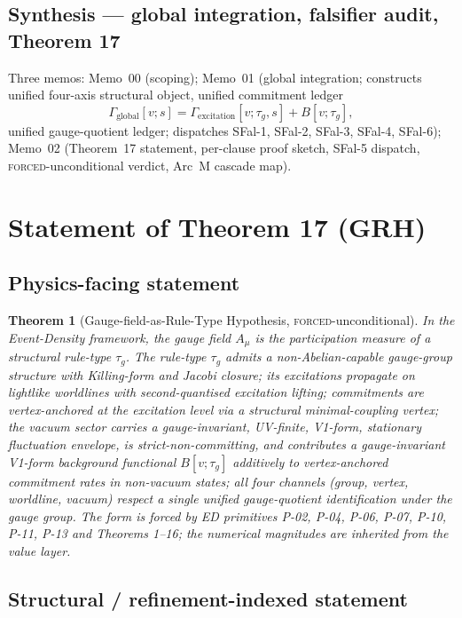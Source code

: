\documentclass[11pt,a4paper]{article}
\newtheorem{theorem}{Theorem}
\begin{document}
\subsection{Synthesis --- global integration, falsifier audit, Theorem 17}

Three memos: Memo~00 (scoping); Memo~01 (global integration; constructs unified four-axis structural object, unified commitment ledger
\[
\Gamma_{\text{global}}[v;s] = \Gamma_{\text{excitation}}[v;\tau_g,s] + B[v;\tau_g],
\]
unified gauge-quotient ledger; dispatches SFal-1, SFal-2, SFal-3, SFal-4, SFal-6); Memo~02 (Theorem~17 statement, per-clause proof sketch, SFal-5 dispatch, \textsc{forced}-unconditional verdict, Arc~M cascade map).

\section{Statement of Theorem 17 (GRH)}

\subsection{Physics-facing statement}

\begin{theorem}[Gauge-field-as-Rule-Type Hypothesis, \textsc{forced}-unconditional]
\label{thm:grh}
In the Event-Density framework, the gauge field $A_\mu$ is the participation measure of a structural rule-type $\tau_g$. The rule-type $\tau_g$ admits a non-Abelian-capable gauge-group structure with Killing-form and Jacobi closure; its excitations propagate on lightlike worldlines with second-quantised excitation lifting; commitments are vertex-anchored at the excitation level via a structural minimal-coupling vertex; the vacuum sector carries a gauge-invariant, UV-finite, V1-form, stationary fluctuation envelope, is strict-non-committing, and contributes a gauge-invariant V1-form background functional $B[v;\tau_g]$ additively to vertex-anchored commitment rates in non-vacuum states; all four channels (group, vertex, worldline, vacuum) respect a single unified gauge-quotient identification under the gauge group. The form is forced by ED primitives P-02, P-04, P-06, P-07, P-10, P-11, P-13 and Theorems 1--16; the numerical magnitudes are inherited from the value layer.
\end{theorem}

\subsection{Structural / refinement-indexed statement}
\end{document}
